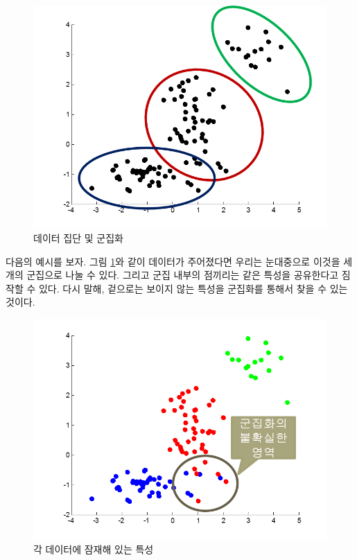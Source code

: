 \documentclass[a4paper]{oblivoir}
\begin{document}
\begin{figure}[ht] \centering 
\includegraphics[scale=0.6]{fig8_2.png} 
\caption{데이터 집단 및 군집화}
\label{fig:8-2}
\end{figure} 

다음의 예시를 보자. 그림 \ref{fig:8-2}와 같이 데이터가 주어졌다면 우리는 눈대중으로 이것을 세 개의 군집으로 나눌 수 있다. 그리고 군집 내부의 점끼리는 같은 특성을 공유한다고 짐작할 수 있다. 다시 말해, 겉으로는 보이지 않는 특성을 군집화를 통해서 찾을 수 있는 것이다.  \\

\begin{figure}[ht] \centering 
\includegraphics[scale=0.6]{fig8_1.png} 
\caption{각 데이터에 잠재해 있는 특성}
\label{fig:8-1}
\end{figure} 
\end{document}
